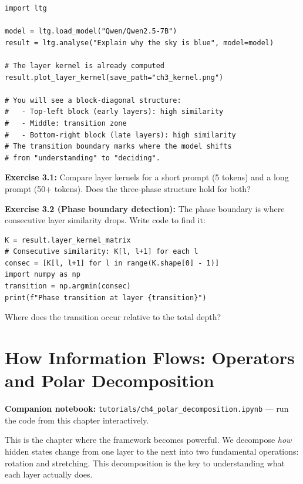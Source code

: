 \documentclass[11pt, twoside, openright]{memoir}
\newcommand{\notebook}[1]{%
  \begin{tcolorbox}[enhanced, colback=LBlue!30, colframe=Blue!60,
    left=4pt, right=4pt, top=3pt, bottom=3pt, boxrule=0.6pt, arc=2pt,
    before skip=6pt, after skip=10pt]
    {\small\sffamily\color{Navy} \textbf{Companion notebook:}
    \texttt{tutorials/#1} --- run the code from this chapter interactively.}
  \end{tcolorbox}%
}
\begin{document}
\begin{lstlisting}[caption={Visualising the layer kernel to see computational phases}]
import ltg

model = ltg.load_model("Qwen/Qwen2.5-7B")
result = ltg.analyse("Explain why the sky is blue", model=model)

# The layer kernel is already computed
result.plot_layer_kernel(save_path="ch3_kernel.png")

# You will see a block-diagonal structure:
#   - Top-left block (early layers): high similarity
#   - Middle: transition zone
#   - Bottom-right block (late layers): high similarity
# The transition boundary marks where the model shifts
# from "understanding" to "deciding".
\end{lstlisting}

\begin{tryit}
\textbf{Exercise 3.1:} Compare layer kernels for a short prompt (5 tokens)
and a long prompt (50+ tokens). Does the three-phase structure hold for both?

\textbf{Exercise 3.2 (Phase boundary detection):} The phase boundary is
where consecutive layer similarity drops. Write code to find it:
\begin{lstlisting}
K = result.layer_kernel_matrix
# Consecutive similarity: K[l, l+1] for each l
consec = [K[l, l+1] for l in range(K.shape[0] - 1)]
import numpy as np
transition = np.argmin(consec)
print(f"Phase transition at layer {transition}")
\end{lstlisting}
Where does the transition occur relative to the total depth?
\end{tryit}


\chapter{How Information Flows: Operators and Polar Decomposition}
\label{chap:operators}

\notebook{ch4\_polar\_decomposition.ipynb}

\begin{whycare}
This is the chapter where the framework becomes powerful. We decompose
\emph{how} hidden states change from one layer to the next into two
fundamental operations: rotation and stretching. This decomposition is
the key to understanding what each layer actually does.
\end{whycare}
\end{document}
